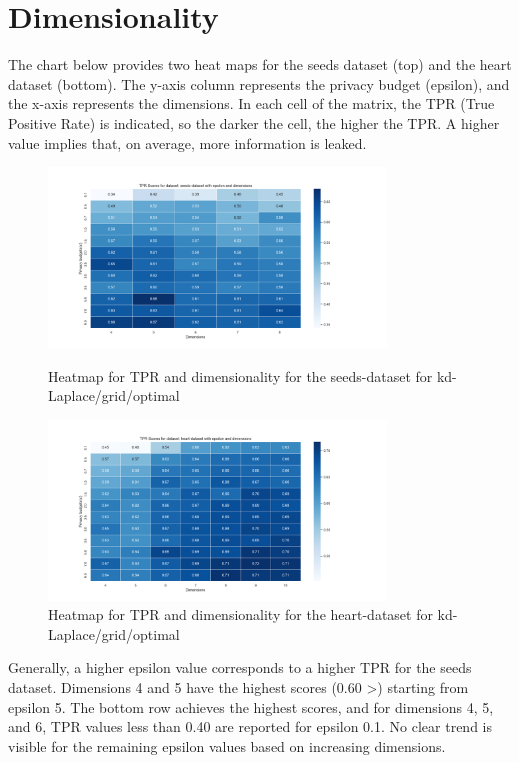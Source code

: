 \newpage
\section{Dimensionality}
The chart below provides two heat maps for the seeds dataset (top) and the heart dataset (bottom). The y-axis column represents the privacy budget (epsilon), and the x-axis represents the dimensions. In each cell of the matrix, the TPR (True Positive Rate) is indicated, so the darker the cell, the higher the TPR. A higher value implies that, on average, more information is leaked.
\begin{figure}[H]
    \includegraphics[width=0.8\textwidth]{Results/RQ3/seeds-dataset/security_dimensions_heatmap_nd-laplace-optimal-truncated.png}
    \caption{Heatmap for TPR and dimensionality for the seeds-dataset for kd-Laplace/grid/optimal}
    \label{fig:security_dimensions_heatmap_seeds-dataset_comparison_nd-laplace-optimal-truncated}
    \includegraphics[width=0.8\textwidth]{Results/RQ3/heart-dataset/security_dimensions_heatmap_nd-laplace-optimal-truncated.png}
    \caption{Heatmap for TPR and dimensionality for the heart-dataset for kd-Laplace/grid/optimal}
    \label{fig:security_dimensions_heatmap_hearts-dataset_comparison_nd-laplace-optimal-truncated}
\end{figure}
Generally, a higher epsilon value corresponds to a higher TPR for the seeds dataset. Dimensions 4 and 5 have the highest scores (0.60 >) starting from epsilon 5. The bottom row achieves the highest scores, and for dimensions 4, 5, and 6, TPR values less than 0.40 are reported for epsilon 0.1. No clear trend is visible for the remaining epsilon values based on increasing dimensions.


